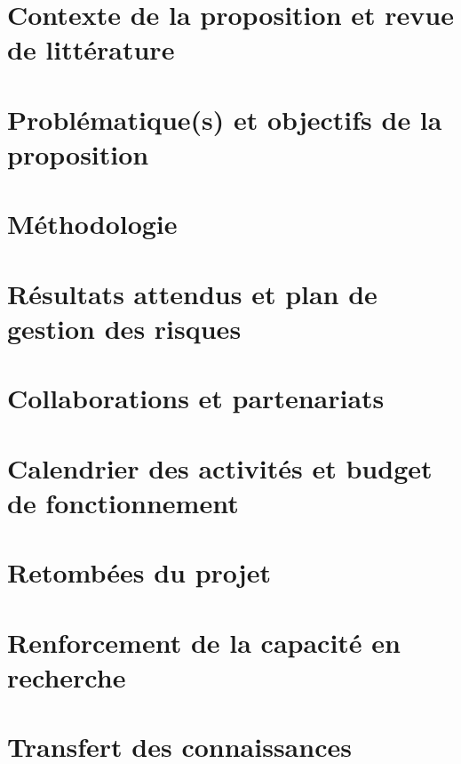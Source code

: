 \documentclass{fqr}
\renewcommand{\nombreDePages}{7}
\begin{document}
\section{Contexte de la proposition et revue de littérature}

\cite{Bergeron2021}


\section{Problématique\hspace{1pt}(s) et objectifs de la proposition}
\section{Méthodologie}
\section{Résultats attendus et plan de gestion des risques}
\section{Collaborations et partenariats}
\section{Calendrier des activités et budget de fonctionnement}
\section{Retombées du projet}
\section{Renforcement de la capacité en recherche}
\section{Transfert des connaissances}

\pagebreak

\setcounter{page}{1}
\renewcommand{\nombreDePages}{1}
\renewcommand{\section}[2]{}

\printbibliography{}
\end{document}
